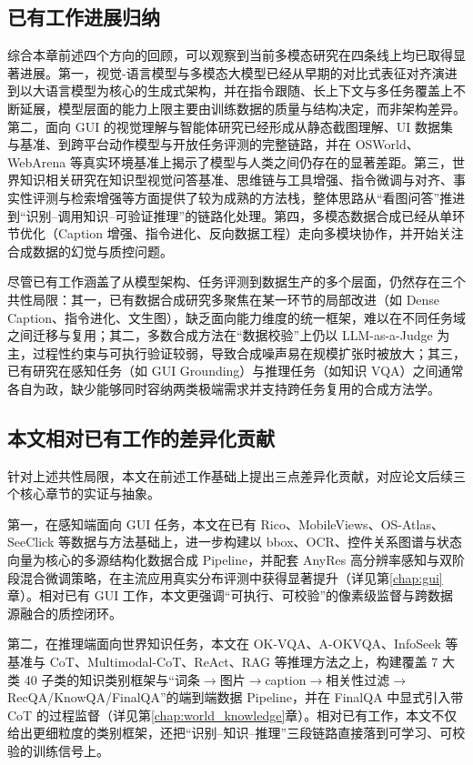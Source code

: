 \subsection{已有工作进展归纳}
综合本章前述四个方向的回顾，可以观察到当前多模态研究在四条线上均已取得显著进展。第一，视觉-语言模型与多模态大模型已经从早期的对比式表征对齐演进到以大语言模型为核心的生成式架构，并在指令跟随、长上下文与多任务覆盖上不断延展，模型层面的能力上限主要由训练数据的质量与结构决定，而非架构差异。第二，面向 GUI 的视觉理解与智能体研究已经形成从静态截图理解、UI 数据集与基准、到跨平台动作模型与开放任务评测的完整链路，并在 OSWorld、WebArena 等真实环境基准上揭示了模型与人类之间仍存在的显著差距。第三，世界知识相关研究在知识型视觉问答基准、思维链与工具增强、指令微调与对齐、事实性评测与检索增强等方面提供了较为成熟的方法栈，整体思路从“看图问答”推进到“识别--调用知识--可验证推理”的链路化处理。第四，多模态数据合成已经从单环节优化（Caption 增强、指令进化、反向数据工程）走向多模块协作，并开始关注合成数据的幻觉与质控问题。

尽管已有工作涵盖了从模型架构、任务评测到数据生产的多个层面，仍然存在三个共性局限：其一，已有数据合成研究多聚焦在某一环节的局部改进（如 Dense Caption、指令进化、文生图），缺乏面向能力维度的统一框架，难以在不同任务域之间迁移与复用；其二，多数合成方法在“数据校验”上仍以 LLM-as-a-Judge 为主，过程性约束与可执行验证较弱，导致合成噪声易在规模扩张时被放大；其三，已有研究在感知任务（如 GUI Grounding）与推理任务（如知识 VQA）之间通常各自为政，缺少能够同时容纳两类极端需求并支持跨任务复用的合成方法学。

\subsection{本文相对已有工作的差异化贡献}
针对上述共性局限，本文在前述工作基础上提出三点差异化贡献，对应论文后续三个核心章节的实证与抽象。

第一，在感知端面向 GUI 任务，本文在已有 Rico、MobileViews、OS-Atlas、SeeClick 等数据与方法基础上，进一步构建以 bbox、OCR、控件关系图谱与状态向量为核心的多源结构化数据合成 Pipeline，并配套 AnyRes 高分辨率感知与双阶段混合微调策略，在主流应用真实分布评测中获得显著提升（详见第\ref{chap:gui}章）。相对已有 GUI 工作，本文更强调“可执行、可校验”的像素级监督与跨数据源融合的质控闭环。

第二，在推理端面向世界知识任务，本文在 OK-VQA、A-OKVQA、InfoSeek 等基准与 CoT、Multimodal-CoT、ReAct、RAG 等推理方法之上，构建覆盖 7 大类 40 子类的知识类别框架与“词条$\rightarrow$图片$\rightarrow$caption$\rightarrow$相关性过滤$\rightarrow$RecQA/\allowbreak KnowQA/\allowbreak FinalQA”的端到端数据 Pipeline，并在 FinalQA 中显式引入带 CoT 的过程监督（详见第\ref{chap:world_knowledge}章）。相对已有工作，本文不仅给出更细粒度的类别框架，还把“识别--知识--推理”三段链路直接落到可学习、可校验的训练信号上。

